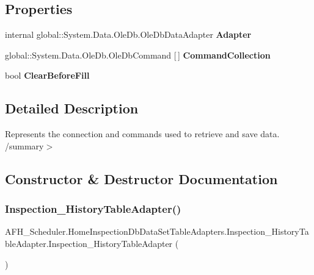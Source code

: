 \subsection*{Properties}
\begin{DoxyCompactItemize}
\item 
internal global\+::\+System.\+Data.\+Ole\+Db.\+Ole\+Db\+Data\+Adapter \textbf{ Adapter}\hspace{0.3cm}{\ttfamily  [get]}
\item 
global\+::\+System.\+Data.\+Ole\+Db.\+Ole\+Db\+Command [$\,$] \textbf{ Command\+Collection}\hspace{0.3cm}{\ttfamily  [get]}
\item 
bool \textbf{ Clear\+Before\+Fill}\hspace{0.3cm}{\ttfamily  [get, set]}
\end{DoxyCompactItemize}


\subsection{Detailed Description}
Represents the connection and commands used to retrieve and save data. /summary$>$ 

\subsection{Constructor \& Destructor Documentation}
\mbox{\label{class_a_f_h___scheduler_1_1_home_inspection_db_data_set_table_adapters_1_1_inspection___history_table_adapter_a20ed90cf262a43425595fd767ab6d102}} 
\subsubsection{Inspection\_HistoryTableAdapter()}
{\footnotesize\ttfamily A\+F\+H\+\_\+\+Scheduler.\+Home\+Inspection\+Db\+Data\+Set\+Table\+Adapters.\+Inspection\+\_\+\+History\+Table\+Adapter.\+Inspection\+\_\+\+History\+Table\+Adapter (\begin{DoxyParamCaption}{ }\end{DoxyParamCaption})}



